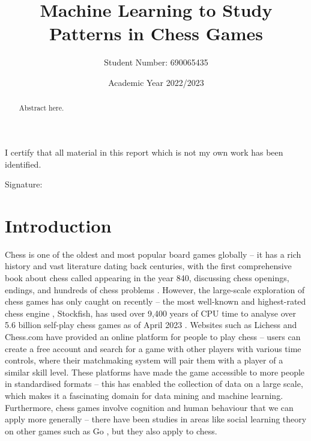 \documentclass[a4paper, 11pt]{article}
\begin{document}
\title{Machine Learning to Study Patterns in Chess Games}
\author{Student Number: 690065435}
\date{Academic Year 2022/2023}

\maketitle

\begin{abstract}
{Abstract here}.

\begin{center}
\end{center}
\end{abstract}

\vspace*{\fill}
\begin{center}

\vspace{1em}
I certify that all material in this report which is not my own work has been identified.
\end{center}
\vspace{1em}

Signature: \hrulefill

\newpage
\tableofcontents
\newpage

\section{Introduction}
Chess is one of the oldest and most popular board games globally -- it has a rich history and vast literature dating back centuries, with the first comprehensive book about chess called  appearing in the year 840, discussing chess openings, endings, and hundreds of chess problems \cite{earliestChessBooks,wonning2014short}. However, the large-scale exploration of chess games has only caught on recently -- the most well-known and highest-rated chess engine \cite{computerChessRatingLists}, Stockfish, has used over 9,400 years of CPU time to analyse over 5.6 billion self-play chess games as of April 2023 \cite{stockfishTestingFramework}. Websites such as Lichess and Chess.com have provided an online platform for people to play chess -- users can create a free account and search for a game with other players with various time controls, where their matchmaking system will pair them with a player of a similar skill level. These platforms have made the game accessible to more people in standardised formats -- this has enabled the collection of data on a large scale, which makes it a fascinating domain for data mining and machine learning. Furthermore, chess games involve cognition and human behaviour that we can apply more generally -- there have been studies in areas like social learning theory on other games such as Go \cite{beheim2014strategic}, but they also apply to chess.
\end{document}
